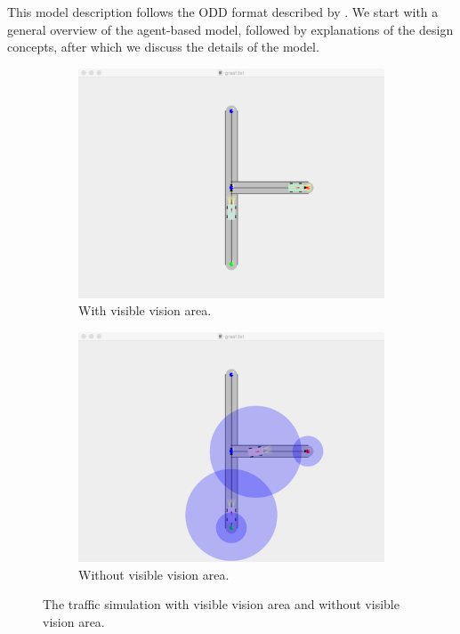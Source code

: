 
This model description follows the ODD format described by \textcite{grimm2006standard}. We start with a general overview of the agent-based model, followed by explanations of the design concepts, after which we discuss the details of the model. 

\begin{figure}
	\centering
	\begin{subfigure}{0.49\textwidth}
		\centering
		\includegraphics[width=\textwidth]{./img/model_simulationView}
		\caption{With visible vision area.}
		\label{fig:model:simulation:fix}
	\end{subfigure}
	\begin{subfigure}{0.49\textwidth}
		\centering
		\includegraphics[width=\textwidth]{./img/model_simulationView_fieldOfView}
		\caption{Without visible vision area.}
		\label{fig:model:simulation:nofix}
	\end{subfigure}	
	\caption{The traffic simulation with  visible vision area and  without visible vision area.}
	\label{fig:model:simulation}
\end{figure}

